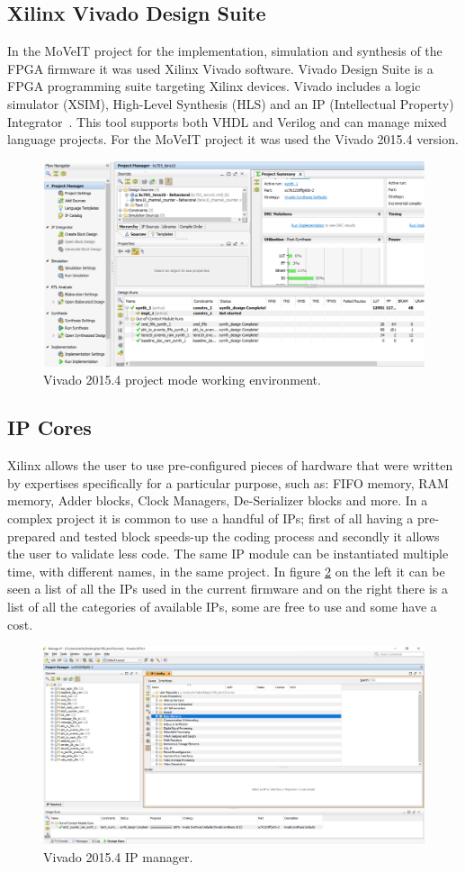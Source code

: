 \subsection{Xilinx Vivado Design Suite}
\noindent In the MoVeIT project for the implementation, simulation and synthesis of the FPGA firmware it was used Xilinx Vivado software.
Vivado Design Suite is a FPGA programming suite targeting Xilinx devices.
Vivado includes a logic simulator (XSIM), High-Level Synthesis (HLS) and an IP (Intellectual Property) Integrator~\cite{vivado}.
This tool supports both VHDL and Verilog and can manage mixed language projects.
For the MoVeIT project it was used the Vivado 2015.4 version. 
\begin{figure}[H]
	\centering
	\includegraphics[width=0.7\linewidth]{IMG/ch3/VIVADO}
	\caption{Vivado 2015.4 project mode working environment.}
	\label{fig:vivado}
\end{figure}

\subsection{IP Cores}
\noindent Xilinx allows the user to use pre-configured pieces of hardware that were written by expertises specifically for a particular purpose, such as: FIFO memory, RAM memory, Adder blocks, Clock Managers, De-Serializer blocks and more.
In a complex project it is common to use a handful of IPs; first of all having a pre-prepared and tested block speeds-up the coding process and secondly it allows the user to validate less code. The same IP module can be instantiated multiple time, with different names, in the same project. In figure \ref{fig:ip}  on the left it can be seen a list of all the IPs used in the current firmware and on the right there is a list of all the categories of available IPs, some are free to use and some have a cost.
\begin{figure}[H]
	\centering
	\includegraphics[width=0.9\linewidth]{IMG/ch3/IP}
	\caption{Vivado 2015.4 IP manager.}
	\label{fig:ip}
\end{figure} 

